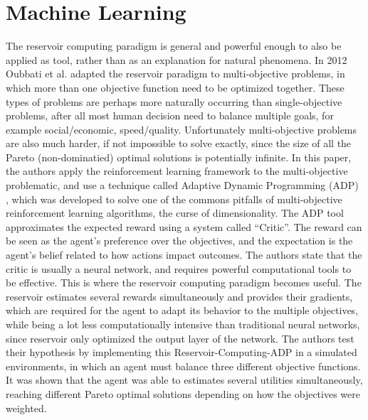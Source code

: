 \documentclass[12pt,oneside]{CUNY_CS_PhD}
\begin{document}
\section{Machine Learning}
The reservoir computing paradigm is general and powerful enough to also be applied as tool, rather than as an explanation for natural phenomena. In 2012 Oubbati et al. \cite{oubbati_multiobjective_2012} adapted the reservoir paradigm to multi-objective problems, in which more than one objective function need to be optimized together.
These types of problems are perhaps more naturally occurring than single-objective problems, after all most human decision need to balance multiple goals, for example social/economic, speed/quality. Unfortunately multi-objective problems are also much harder, if not impossible to solve exactly, since the size of all the Pareto (non-dominatied) optimal solutions is potentially infinite. In this paper, the authors apply the reinforcement learning framework to the multi-objective problematic, and use a technique called Adaptive Dynamic Programming (ADP) \cite{wang2009adaptive}, which was developed to solve one of the commons pitfalls of multi-objective reinforcement learning algorithms, the curse of dimensionality. The ADP tool approximates the expected reward using a system called ``Critic''. The reward can be seen as the agent's preference over the objectives, and the expectation is the agent's belief related to how actions impact outcomes. The authors state that the critic is usually a neural network, and requires powerful computational tools to be effective. This is where the reservoir computing paradigm becomes useful. The reservoir estimates several rewards simultaneously and provides their gradients, which are required for the agent to adapt its behavior to the multiple objectives, while being a lot less computationally intensive than traditional neural networks, since reservoir only optimized the output layer of the network.
The authors test their hypothesis by implementing this Reservoir-Computing-ADP in a simulated environments, in which an agent must balance three different objective functions. It was shown that the agent was able to estimates several utilities simultaneously, reaching different Pareto optimal solutions depending on how the objectives were weighted.
\end{document}
